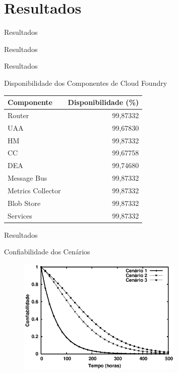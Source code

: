 \documentclass{beamer}
\begin{document}

\section{Resultados}

    \begin{frame}{Resultados}
        \Huge{\centerline{Resultados}}
    \end{frame}

    \begin{frame}{Resultados}
    
        Disponibilidade dos Componentes de Cloud Foundry
        
        \begin{table}[h]
        \centering
        \begin{tabular}{lr}
        \hline
        Componente        & Disponibilidade (\%) \\ \hline
        Router            & 99,87332            \\
        UAA               & 99,67830            \\
        HM                & 99,87332            \\
        CC                & 99,67758            \\
        DEA               & 99,74680            \\
        Message Bus       & 99,87332            \\
        Metrics Collector & 99,87332            \\
        Blob Store        & 99,87332            \\
        Services          & 99,87332            \\ \hline
        \end{tabular}
        \end{table}

    \end{frame}
    
    \begin{frame}{Resultados}
    
        Confiabilidade dos Cenários
    
        \begin{figure}[ht]
            \includegraphics[width=0.70\textwidth]{img/confiabilidade.eps}
        \end{figure}
    
    \end{frame}
    
\end{document}
